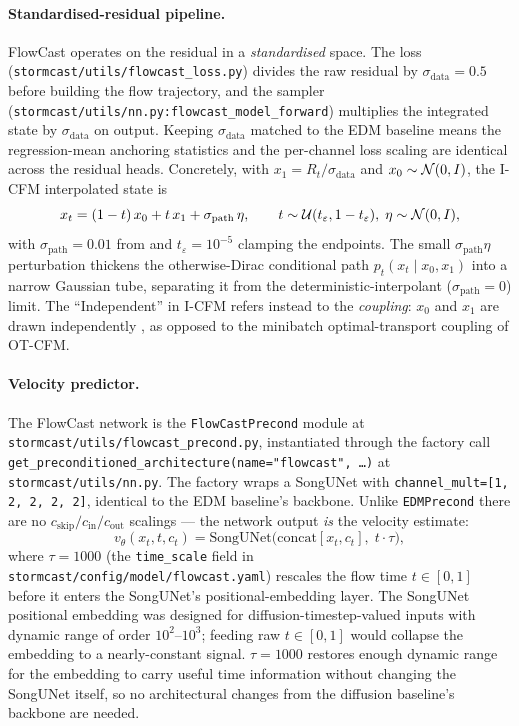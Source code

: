 \paragraph{Standardised-residual pipeline.} FlowCast operates on the residual in a \emph{standardised} space. The loss (\texttt{stormcast/utils/flowcast\_loss.py}) divides the raw residual by $\sigma_{\text{data}} = 0.5$ before building the flow trajectory, and the sampler (\texttt{stormcast/utils/nn.py:flowcast\_model\_forward}) multiplies the integrated state by $\sigma_{\text{data}}$ on output. Keeping $\sigma_{\text{data}}$ matched to the EDM baseline means the regression-mean anchoring statistics and the per-channel loss scaling are identical across the residual heads. Concretely, with $x_1 = R_t / \sigma_{\text{data}}$ and $x_0 \sim \mathcal{N}(0, I)$, the I-CFM interpolated state is
\begin{equation}
  x_t = (1 - t)\,x_0 + t\,x_1 + \sigma_{\text{path}}\,\eta,
  \qquad t \sim \mathcal{U}(t_\varepsilon, 1 - t_\varepsilon),\;\eta \sim \mathcal{N}(0, I),
  \label{eq:flowcast-path}
\end{equation}
with $\sigma_{\text{path}} = 0.01$ from \citet{tong2024improving} and $t_\varepsilon = 10^{-5}$ clamping the endpoints. The small $\sigma_{\text{path}}\eta$ perturbation thickens the otherwise-Dirac conditional path $p_t(x_t \mid x_0, x_1)$ into a narrow Gaussian tube, separating it from the deterministic-interpolant ($\sigma_{\text{path}} = 0$) limit. The ``Independent'' in I-CFM refers instead to the \emph{coupling}: $x_0$ and $x_1$ are drawn independently \citep{tong2024improving}, as opposed to the minibatch optimal-transport coupling of OT-CFM.

\paragraph{Velocity predictor.} The FlowCast network is the \texttt{FlowCastPrecond} module at \texttt{stormcast/utils/flowcast\_precond.py}, instantiated through the factory call \texttt{get\_preconditioned\_architecture(name="flowcast", \ldots)} at \texttt{stormcast/utils/nn.py}. The factory wraps a SongUNet with \texttt{channel\_mult=[1, 2, 2, 2, 2]}, identical to the EDM baseline's backbone. Unlike \texttt{EDMPrecond} there are no $c_{\text{skip}}/c_{\text{in}}/c_{\text{out}}$ scalings --- the network output \emph{is} the velocity estimate:
\begin{equation}
  v_\theta(x_t, t, c_t) = \mathrm{SongUNet}\bigl(\mathrm{concat}[x_t, c_t],\; t \cdot \tau\bigr),
  \label{eq:flowcast-precond}
\end{equation}
where $\tau = 1000$ (the \texttt{time\_scale} field in \texttt{stormcast/config/model/flowcast.yaml}) rescales the flow time $t \in [0, 1]$ before it enters the SongUNet's positional-embedding layer. The SongUNet positional embedding was designed for diffusion-timestep-valued inputs with dynamic range of order $10^{2}$--$10^{3}$; feeding raw $t \in [0, 1]$ would collapse the embedding to a nearly-constant signal. $\tau = 1000$ restores enough dynamic range for the embedding to carry useful time information without changing the SongUNet itself, so no architectural changes from the diffusion baseline's backbone are needed.

